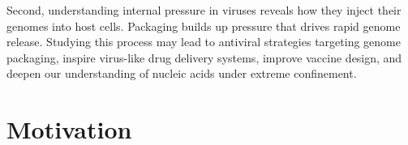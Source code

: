 \documentclass[12pt]{article}
\begin{document}
\begin{flushleft}
Second, understanding internal pressure in viruses reveals how they inject their genomes into host cells. Packaging builds up pressure that drives rapid genome release. Studying this process may lead to antiviral strategies targeting genome packaging, inspire virus-like drug delivery systems, improve vaccine design, and deepen our understanding of nucleic acids under extreme confinement.
\vspace{-1em} 
\section*{Motivation}

\end{flushleft}
\end{document}
